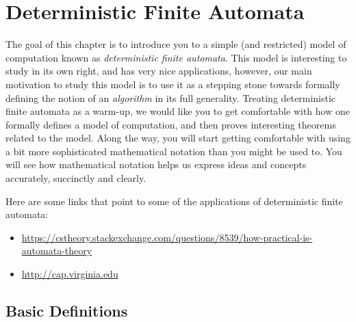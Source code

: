 


\chapter{Deterministic Finite Automata}
\label{chapter:deterministic-finite-automata}


\begin{preamble}
The goal of this chapter is to introduce you to a simple (and restricted) model of computation known as \emph{deterministic finite automata}. This model is interesting to study in its own right, and has very nice applications, however, our main motivation to study this model is to use it as a stepping stone towards formally defining the notion of an \emph{algorithm} in its full generality. Treating deterministic finite automata as a warm-up, we would like you to get comfortable with how one formally defines a model of computation, and then proves interesting theorems related to the model. Along the way, you will start getting comfortable with using a bit more sophisticated mathematical notation than you might be used to. You will see how mathematical notation helps us express ideas and concepts accurately, succinctly and clearly.

Here are some links that point to some of the applications of deterministic finite automata:
\begin{itemize}
    \item \url{https://cstheory.stackexchange.com/questions/8539/how-practical-is-automata-theory}
    \item \url{http://cap.virginia.edu}
\end{itemize}
\end{preamble}





\section{Basic Definitions}



